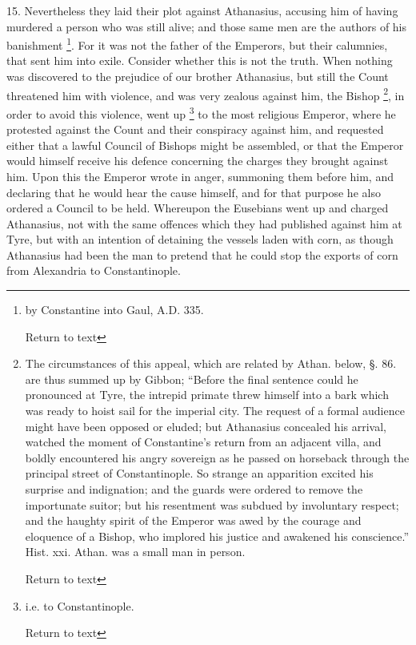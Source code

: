 15. Nevertheless they laid their plot against
Athanasius, accusing him of having murdered a person who was still
alive; and those same men are the authors of his banishment \footnote{by Constantine into Gaul, A.D. 335.

Return to text}. For it was not the father of the Emperors, but their
calumnies, that sent him into exile. Consider whether this is not the
truth. When nothing was discovered to the prejudice of our brother
Athanasius, but still the Count threatened him with violence, and was
very zealous against him, the Bishop \footnote{The circumstances of this appeal, which are related by Athan. below,
§. 86. are thus summed up by Gibbon; ``Before the final sentence could
he pronounced at Tyre, the intrepid primate threw himself into a bark
which was ready to hoist sail for the imperial city. The request of a
formal audience might have been opposed or eluded; but Athanasius
concealed his arrival, watched the moment of Constantine's return from
an adjacent villa, and boldly encountered his angry sovereign as he
passed on horseback through the principal street of Constantinople. So
strange an apparition excited his surprise and indignation; and the
guards were ordered to remove the importunate suitor; but his
resentment was subdued by involuntary respect; and the haughty spirit
of the Emperor was awed by the courage and eloquence of a Bishop, who
implored his justice and awakened his conscience.'' Hist. xxi. Athan.
was a small man in person.

Return to text}, in order to avoid this violence, went up \footnote{i.e. to Constantinople.

Return to text} to the most religious Emperor, where he protested against the
Count and their conspiracy against him, and requested either that a
lawful Council of Bishops might be assembled, or that the Emperor
would himself receive his defence concerning the charges they brought
against him. Upon this the Emperor wrote in anger, summoning them
before him, and declaring that he would hear the cause himself, and
for that purpose he also ordered a Council to be held. Whereupon the
Eusebians went up and charged Athanasius, not with the same offences
which they had published against him at Tyre, but with an intention of
detaining the vessels laden with corn, as though Athanasius had been
the man to pretend that he could stop the exports of corn from
Alexandria to Constantinople.

